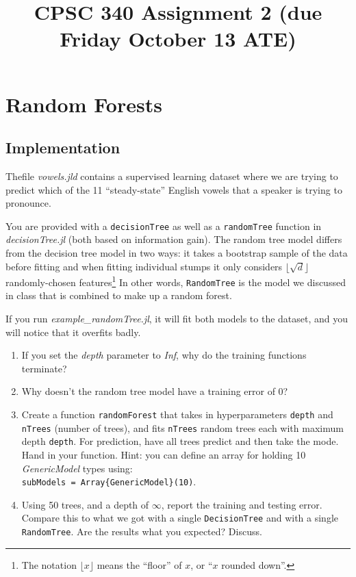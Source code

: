 \documentclass{article}
\def\blu#1{{\color{blu}#1}}
\def\enum#1{\begin{enumerate}#1\end{enumerate}}
\begin{document}
\title{CPSC 340 Assignment 2 (due Friday October 13 ATE)}
\author{}
\date{}
\maketitle
\vspace{-4em}

\section{Random Forests}

 
 \subsection{Implementation}
 
Thefile \emph{vowels.jld} contains a supervised learning dataset where we are trying to predict which of the 11 ``steady-state'' English vowels that a speaker is trying to pronounce.

You are provided with a \texttt{decisionTree} as well as a \texttt{randomTree} function in \emph{decisionTree.jl} (both based on information gain). The random tree model differs from the decision tree model in two ways: 
it takes a bootstrap sample of the data before fitting and when fitting individual stumps it only considers $\lfloor \sqrt{d} \rfloor$ randomly-chosen features\footnote{The notation $\lfloor x\rfloor$ means the ``floor'' of $x$, or ``$x$ rounded down''.}  
In other words, \texttt{RandomTree} is the model we discussed in class that is combined to make up a random forest.

If you run \emph{example\_randomTree.jl}, it will fit both models to the dataset, and you will notice that it overfits badly.

\blu{
\enum{
\item If you set the \emph{depth} parameter to \emph{Inf}, why do the training functions terminate?
\item Why doesn't the random tree model have a training error of 0?
\item Create a function \texttt{randomForest} that takes in hyperparameters \texttt{depth} and \texttt{nTrees} (number of trees), and 
fits \texttt{nTrees} random trees each with maximum depth \texttt{depth}. For prediction, have all trees predict and then take the mode. Hand in your function. Hint: you can define an array for holding 10 \emph{GenericModel} types using:\\
\texttt{subModels = Array\{GenericModel\}(10)}.
\item Using 50 trees, and a depth of $\infty$, report the training and testing error. Compare this to what we got with a single \texttt{DecisionTree} and with a single \texttt{RandomTree}. Are the results what you expected? Discuss. 
}
}
\end{document}
